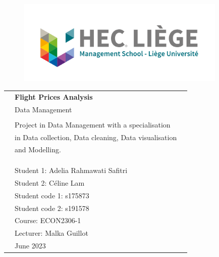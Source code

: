 \begin{center}

\vspace*{1cm}

\begin{figure}
  \raggedleft
  \begin{minipage}{8cm}
  \includegraphics[width=10cm]{images/logo.png}
  \end{minipage}
\end{figure}

\vspace*{2cm}

\vspace*{0.1in}

\begin{spacing}{1.7}

\begin{tabular}{p{4cm} ll}

& \textbf{\huge Flight Prices Analysis}\\ %
& \Large Data Management\\ %
& \\
& \large Project in Data Management with a specialisation  \\
& \large in Data collection, Data cleaning, Data visualisation \\
& \large and Modelling.\\ &

\\\\

& \\
& \large Student 1: Adelia Rahmawati Safitri \\
& \large Student 2: Céline Lam \\
& \large Student code 1: s175873\\
& \large Student code 2: s191578\\
& \large Course: ECON2306-1 \\
& \large Lecturer: Malka Guillot\\
& \large June 2023
\end{tabular}

\end{spacing}

\end{center}



\thispagestyle{empty} %
\clearpage\setcounter{page}{1} %
